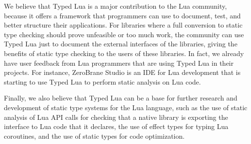 We believe that Typed Lua is a major contribution to the Lua community,
because it offers a framework that programmers can use to document,
test, and better structure their applications.
For libraries where a full conversion to static type checking should
prove unfeasible or too much work, the community can use Typed Lua
just to document the external interfaces of the libraries,
giving the benefits of static type checking to the users of these
libraries.
In fact, we already have user feedback from Lua programmers that are
using Typed Lua in their projects.
For instance, ZeroBrane Studio is an IDE for Lua development that is
starting to use Typed Lua to perform static analysis on Lua code.

Finally, we also believe that Typed Lua can be a base for further research
and development of static type systems for the Lua language, such as
the use of static analysis of Lua API calls for checking that a native library is
exporting the interface to Lua code that it declares, the use of
effect types for typing Lua coroutines, and the use of static types
for code optimization.

